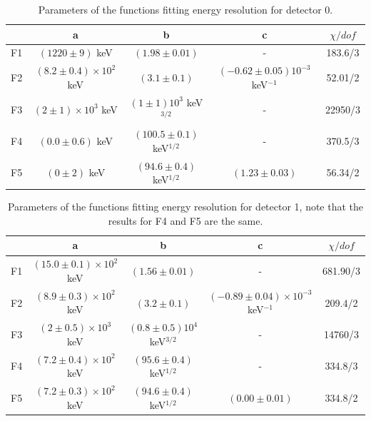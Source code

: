 \begin{table}[ht]
    \centering
    \begin{tabular}{|c|c|c|c|c|}
    \hline
     & a & b & c & $\chi /dof$  \\
    \hline
    F1 & $(1220 \pm 9)$ keV & $(1.98 \pm 0.01)$ & - & 183.6/3 \\
    F2 & $(8.2 \pm 0.4) \times 10^2$ keV & $(3.1 \pm 0.1)$ & $(-0.62 \pm 0.05)10^{-3}$ keV$^{-1}$ & 52.01/2 \\
    F3 & $(2 \pm 1) \times 10^3$ keV & $(1 \pm 1)10^3$ keV$^{3/2}$ & - & 22950/3 \\
    F4 & $(0.0 \pm 0.6)$ keV & $(100.5 \pm 0.1)$ keV$^{1/2}$ & - & 370.5/3 \\
    F5 & $(0 \pm 2)$ keV & $(94.6 \pm 0.4)$ keV$^{1/2}$ & $(1.23 \pm 0.03)$ & 56.34/2 \\
    \hline
    \end{tabular}
    \caption{Parameters of the functions fitting energy resolution for detector 0.}
    \label{table:fit_res0}
\end{table}

\begin{table}[ht]
    \centering
    \begin{tabular}{|c|c|c|c|c|}
    \hline
     & a & b & c & $\chi /dof$  \\
    \hline
    F1 & $(15.0 \pm 0.1) \times 10^2$ keV & $(1.56 \pm 0.01)$ & - & 681.90/3 \\
    F2 & $(8.9 \pm 0.3) \times 10^2$ keV & $(3.2 \pm 0.1)$ & $(-0.89 \pm 0.04) \times 10^{-3}$ keV$^{-1}$ & 209.4/2 \\
    F3 & $(2 \pm 0.5) \times 10^3$ keV & $(0.8 \pm 0.5)10^4$ keV$^{3/2}$ & - & 14760/3 \\
    F4 & $(7.2 \pm 0.4) \times 10^2$ keV & $(95.6 \pm 0.4)$ keV$^{1/2}$ & - & 334.8/3 \\
    F5 & $(7.2 \pm 0.3) \times 10^2$ keV & $(94.6 \pm 0.4)$ keV$^{1/2}$ & $(0.00 \pm 0.01)$ & 334.8/2\\
    \hline
    \end{tabular}
    \caption{Parameters of the functions fitting energy resolution for detector 1, note that the results for F4 and F5 are the same.}
    \label{table:fit_res1}
\end{table}

